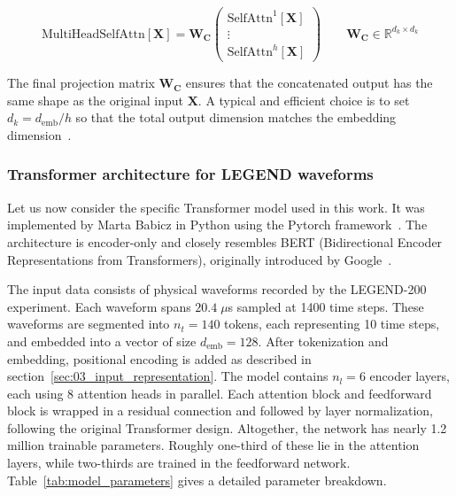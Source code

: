\begin{equation}
\label{eq:multi_head_attn}
	\mathrm{MultiHeadSelfAttn}[\mathbf{X}] = \mathbf{W_C} \begin{pmatrix} \mathrm{SelfAttn}^{1}[\mathbf{X}] \\
	\vdots \\
	\mathrm{SelfAttn}^{h}[\mathbf{X}] \end{pmatrix} \qquad \mathbf{W_C} \in \mathbb{R}^{d_k \times d_k}
\end{equation}

The final projection matrix $\mathbf{W_C}$ ensures that the concatenated output has the same shape as the original input $\mathbf{X}$. A typical and efficient choice is to set $d_k = d_{\mathrm{emb}}/h$ so that the total output dimension matches the embedding dimension~\cite{zhang_dive_2023, prince_understanding_2023, murphy_probabilistic_2022}. 


\subsubsection{Transformer architecture for LEGEND waveforms}\label{sec:04_transformer_used}

Let us now consider the specific Transformer model used in this work. It was implemented by Marta Babicz in Python using the Pytorch framework~\cite{ansel_pytorch_2024}. The architecture is encoder-only and closely resembles BERT (Bidirectional Encoder Representations from Transformers), originally introduced by Google~\cite{devlin_bert_2019}.


The input data consists of physical waveforms recorded by the LEGEND-200 experiment. Each waveform spans $20.4 \;\mu$s sampled at 1400 time steps. These waveforms are segmented into $n_t = 140$ tokens, each representing 10 time steps, and embedded into a vector of size $d_{\mathrm{emb}} = 128$. After tokenization and embedding, positional encoding is added as described in section~\ref{sec:03_input_representation}. 
The model contains $n_l = 6$ encoder layers, each using 8 attention heads in parallel. Each attention block and feedforward block is wrapped in a residual connection and followed by layer normalization, following the original Transformer design. 
Altogether, the network has nearly 1.2 million trainable parameters. Roughly one-third of these lie in the attention layers, while two-thirds are trained in the feedforward network. Table~\ref{tab:model_parameters} gives a detailed parameter breakdown. 

